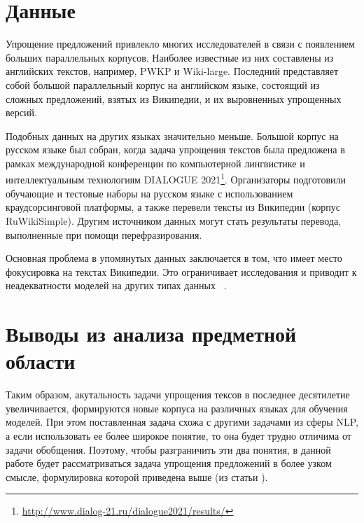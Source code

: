 \section{Данные}

Упрощение предложений привлекло многих исследователей в связи с появлением больших параллельных корпусов. Наиболее известные из них составлены из английских текстов, например, PWKP и Wiki-large. Последний представляет собой большой параллельный корпус на английском языке, состоящий из сложных предложений, взятых из Википедии, и их выровненных упрощенных версий.

Подобных данных на других языках значительно меньше. Большой корпус на русском языке был собран, когда задача упрощения текстов была предложена в рамках международной конференции по компьютерной лингвистике и интеллектуальным технологиям DIALOGUE 2021\footnote{\url{http://www.dialog-21.ru/dialogue2021/results/}}. Организаторы подготовили обучающие и тестовые наборы на русском языке с использованием краудсорсинговой платформы, а также перевели тексты из Википедии (корпус RuWikiSimple). Другим источником данных могут стать результаты перевода, выполненные при помощи перефразирования\cite{kazan_federal_university}.  

Основная проблема в упомянутых данных заключается в том, что имеет место фокусировка на текстах Википедии. Это ограничивает исследования и приводит к неадекватности моделей на других типах данных ~\cite{kazan_federal_university}. 



\section*{Выводы из анализа предметной области}

Таким образом, акутальность задачи упрощения тексов в последнее десятилетие увеличивается, формируются новые корпуса на различных языках для обучения моделей.  При этом поставленная задача схожа с другими задачами из сферы NLP, а если использовать ее более широкое понятие, то она будет трудно отличима от задачи обобщения. Поэтому, чтобы разграничить эти два понятия, в данной работе будет рассматриваться задача упрощения предложений в более узком смысле, формулировка которой приведена выше (из статьи \cite{martin_muss_2021}).
